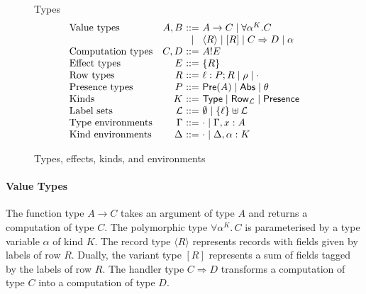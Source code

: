\documentclass[mscres,cdtppar,twoside,openright,logo,rightchapter,normalheadings]{infthesis}
\makeatletter
\theoremstyle{definition}
\newcommand{\slab}[1]{\textrm{#1}}
\newcommand{\Record}[1]{\ensuremath{\langle #1 \rangle}}
\newcommand{\Pre}[1]{\mathsf{Pre}(#1)}
\newcommand{\Abs}{\mathsf{Abs}}
\newcommand{\Presence}{\mathsf{Presence}}
\newcommand{\Row}{\mathsf{Row}}
\newcommand{\Type}{\mathsf{Type}}
\newcommand{\Int}{\mathsf{Int}}
\newcommand{\Bool}{\mathsf{Bool}}
\newcommand{\eff}{!}
\newcommand{\Harrow}[4]{#1!#2 \Rightarrow #3!#4}
\newcommand{\ba}{\begin{array}}
\newcommand{\ea}{\end{array}}
\newenvironment{syntax}{\[\ba{@{}l@{\quad}r@{~}c@{~}l@{}}}{\ea\]\ignorespacesafterend}
\makeatother
\begin{document}
\begin{figure}
Types
\begin{syntax}
\slab{Value types}    &A,B  &::= & %
                                      A \to C
                               \mid  \forall \alpha^K.C \\
                             &&\mid& \Record{R} \mid [R]
                               \mid  C \Rightarrow D \mid \alpha \\
\slab{Computation types} 
                      &C,D  &::= & A \eff E \\
\slab{Effect types}   &E    &::= & \{R\}\\
\slab{Row types}      &R    &::= & \ell : P;R \mid \rho \mid \cdot \\
\slab{Presence types} &P    &::= & \Pre{A} \mid \Abs \mid \theta\\
\slab{Kinds}          &K    &::= & \Type \mid \Row_\mathcal{L} \mid \Presence\\
\slab{Label sets}     &\mathcal{L} &::=& \emptyset \mid \{\ell\} \uplus \mathcal{L}\\
\slab{Type environments} &\Gamma &::=& \cdot \mid \Gamma, x:A \\
\slab{Kind environments} &\Delta &::=& \cdot \mid \Delta, \alpha:K \\
\end{syntax}
\caption{Types, effects, kinds, and environments}
\label{fig:types-syntax}
\end{figure}

\paragraph{Value Types}
The function type $A \to C$ takes an argument of type $A$ and returns
a computation of type $C$.
The polymorphic type $\forall \alpha^K .\, C$ is parameterised by a
type variable $\alpha$ of kind $K$. The record type $\Record{R}$
represents records with fields given by labels of row $R$. Dually, the
variant type $[R]$ represents a sum of fields tagged by the labels of
row $R$. The handler type $C \Rightarrow D$ transforms a computation
of type $C$ into a computation of type $D$.
\end{document}
